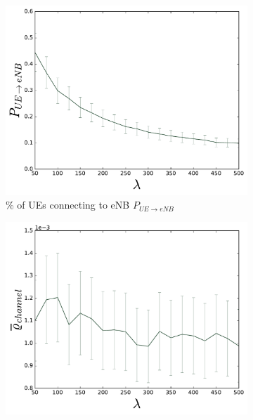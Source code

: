 \begin{figure}
  \begin{subfigure}[b]{0.5\linewidth}
    \centering
    \captionsetup{justification=centering}
    \includegraphics[width=1\linewidth]{figures/COMPLETE_2} 
    \caption{\% of UEs connecting to eNB $P_{UE\rightarrow eNB}$ }
    \label{fig:COMPLETE_2} 
    \vspace{4ex}
  \end{subfigure}%
  \begin{subfigure}[b]{0.5\linewidth}
    \centering
    \captionsetup{justification=centering}
    \includegraphics[width=1\linewidth]{figures/COMPLETE_8} 

\end{subfigure}
\end{figure}
